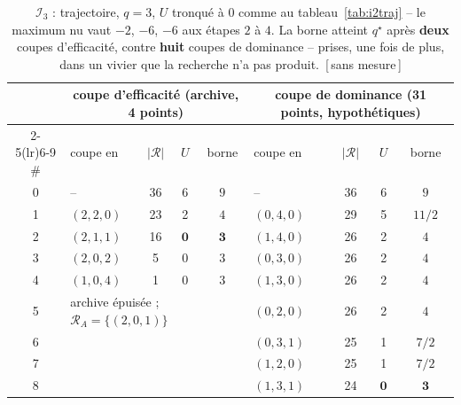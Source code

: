 \documentclass[11pt,a4paper]{article}
\theoremstyle{plain}
\theoremstyle{remark}
\newcommand{\Rcal}{\mathcal{R}}
\newcommand{\qs}{q^{\star}}
\newcommand{\confna}{\textsf{\footnotesize[\,sans mesure\,]}}
\begin{document}
\begin{table}[H]
\centering
\caption{$\mathcal{I}_3$ : trajectoire, $q=3$, $U$ tronqué à $0$ comme au
tableau~\ref{tab:i2traj} -- le maximum nu vaut $-2$, $-6$, $-6$ aux
étapes $2$ à $4$. La borne atteint $\qs$ après
\textbf{deux} coupes d'efficacité, contre \textbf{huit} coupes de dominance
-- prises, une fois de plus, dans un vivier que la recherche n'a pas produit.\ \confna}
\label{tab:i3traj}
\setlength{\tabcolsep}{6pt}
\begin{tabular}{clccc@{\qquad}lccc}
\toprule
& \multicolumn{4}{c}{\textbf{coupe d'efficacité} (archive, 4 points)}
& \multicolumn{4}{c}{coupe de dominance (31 points, hypothétiques)}\\
\cmidrule(lr){2-5}\cmidrule(lr){6-9}
\# & coupe en & $|\Rcal|$ & $U$ & borne
   & coupe en & $|\Rcal|$ & $U$ & borne\\
\midrule
0 & --          & 36 & 6 & $9$      & --          & 36 & 6 & $9$\\
1 & $(2,2,0)$   & 23 & 2 & $4$      & $(0,4,0)$   & 29 & 5 & $11/2$\\
2 & $(2,1,1)$   & 16 & $\mathbf{0}$ & $\mathbf{3}$
                                    & $(1,4,0)$   & 26 & 2 & $4$\\
3 & $(2,0,2)$   &  5 & 0 & $3$      & $(0,3,0)$   & 26 & 2 & $4$\\
4 & $(1,0,4)$   &  1 & 0 & $3$      & $(1,3,0)$   & 26 & 2 & $4$\\
5 & \multicolumn{4}{l}{archive épuisée ; $\Rcal_A=\{(2,0,1)\}$}
  & $(0,2,0)$   & 26 & 2 & $4$\\
6 & & & & & $(0,3,1)$ & 25 & 1 & $7/2$\\
7 & & & & & $(1,2,0)$ & 25 & 1 & $7/2$\\
8 & & & & & $(1,3,1)$ & 24 & $\mathbf{0}$ & $\mathbf{3}$\\
\bottomrule
\end{tabular}
\end{table}
\end{document}
